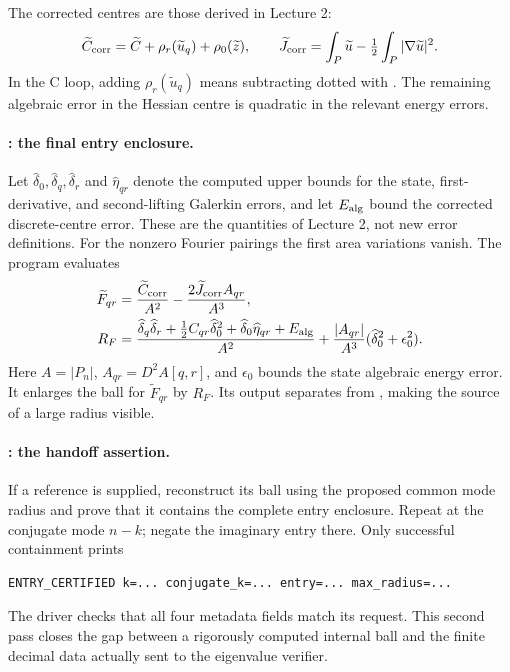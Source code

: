 The corrected centres are those derived in Lecture 2:
\[
 \widetilde C_{\rm corr}
  =\widetilde C+\rho_r(\widetilde u_q)+\rho_0(\widetilde z),
 \qquad
 \widetilde J_{\rm corr}
  =\int_P\widetilde u-\tfrac12\int_P|\nabla\widetilde u|^2.
\]
In the C loop, adding $\rho_r(\widetilde u_q)$ means subtracting
 dotted with . The remaining algebraic error in the
Hessian centre is quadratic in the relevant energy errors.

\paragraph{: the final entry enclosure.}
Let $\widehat\delta_0,\widehat\delta_q,\widehat\delta_r$ and
$\widehat\eta_{qr}$ denote the computed upper bounds for the state,
first-derivative, and second-lifting Galerkin errors, and let
$E_{\rm alg}$ bound the corrected discrete-centre error. These are the
quantities of Lecture 2, not new error definitions. For the nonzero
Fourier pairings the first area variations vanish. The program evaluates
\begin{align*}
 \widetilde F_{qr}
  &=\frac{\widetilde C_{\rm corr}}{A^2}
        -\frac{2\widetilde J_{\rm corr}A_{qr}}{A^3},\\
 R_F&=\frac{\widehat\delta_q\widehat\delta_r
       +\tfrac12 C_{qr}\widehat\delta_0^2
       +\widehat\delta_0\widehat\eta_{qr}+E_{\rm alg}}{A^2}
       +\frac{|A_{qr}|}{A^3}
                    (\widehat\delta_0^2+\epsilon_0^2).
\end{align*}
Here $A=|P_n|$, $A_{qr}=D^2A[q,r]$, and $\epsilon_0$ bounds the state
algebraic energy error. It enlarges the ball for $\widetilde F_{qr}$ by
$R_F$. Its output separates  from
, making the source of a large radius
visible.

\paragraph{: the handoff assertion.}
If a reference is supplied, reconstruct its ball using the proposed common
mode radius and prove that it contains the complete entry enclosure.
Repeat at the conjugate mode $n-k$; negate the imaginary entry there.
Only successful containment prints
\begin{lstlisting}
ENTRY_CERTIFIED k=... conjugate_k=... entry=... max_radius=...
\end{lstlisting}
The driver checks that all four metadata fields match its request. This
second pass closes the gap between a rigorously computed internal ball
and the finite decimal data actually sent to the eigenvalue verifier.

